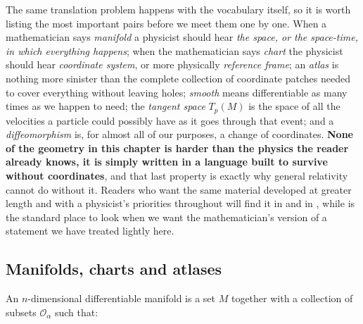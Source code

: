         The same translation problem happens with the vocabulary itself, so it is worth listing the most important pairs before we meet them one by one. When a mathematician says \textit{manifold} a physicist should hear \textit{the space, or the space-time, in which everything happens}; when the mathematician says \textit{chart} the physicist should hear \textit{coordinate system}, or more physically \textit{reference frame}; an \textit{atlas} is nothing more sinister than the complete collection of coordinate patches needed to cover everything without leaving holes; \textit{smooth} means differentiable as many times as we happen to need; the \textit{tangent space} $T_p(M)$ is the space of all the velocities a particle could possibly have as it goes through that event; and a \textit{diffeomorphism} is, for almost all of our purposes, a change of coordinates. \textbf{None of the geometry in this chapter is harder than the physics the reader already knows, it is simply written in a language built to survive without coordinates}, and that last property is exactly why general relativity cannot do without it. Readers who want the same material developed at greater length and with a physicist's priorities throughout will find it in \citet{schutz1980} and in \citet{nakahara2003}, while \citet{wald1984} is the standard place to look when we want the mathematician's version of a statement we have treated lightly here.

    \subsection{Manifolds, charts and atlases}

    \begin{myDef}
        An $n$-dimensional differentiable manifold is a set $M$ together with a collection of subsets $\mathcal{O}_{\alpha}$ such that:
    \end{myDef}

